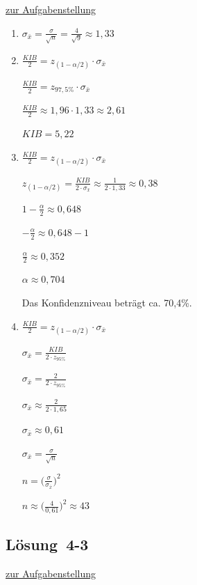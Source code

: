\documentclass[
  11pt,
  ngerman,
  a4paper,
]{report}
\begin{document}
\protect\hyperlink{aufgabe-4-2}{zur Aufgabenstellung}

\begin{enumerate}
\def\labelenumi{\alph{enumi})}
\item
  \(\sigma _{\bar{x}}=\frac{\sigma}{\sqrt{n}}=\frac{4}{\sqrt{9}}\approx1{,}33\)
\item
  \(\frac{\mathit{KIB}}{2}=z_{(1-\alpha/2)} \cdot \sigma_{\bar{x}}\)

  \(\frac{\mathit{KIB}}{2}= z_{97{,}5\%}\cdot \sigma_{\bar{x}}\)

  \(\frac{\mathit{KIB}}{2}\approx 1{,}96 \cdot 1{,}33 \approx 2{,}61\)

  \(\mathit{KIB}=5{,}22\)
\item
  \(\frac{\mathit{KIB}}{2}=z_{(1-\alpha/2)} \cdot \sigma_{\bar{x}}\)

  \(z_{(1-\alpha/2)} = \frac{\mathit{KIB}}{2 \cdot \sigma_{\bar{x}}}\approx\frac{1}{2 \cdot 1{,}33}\approx0{,}38\)

  \(1-\frac{\alpha}{2} \approx 0{,}648\)

  \(-\frac{\alpha}{2} \approx 0{,}648 - 1\)

  \(\frac{\alpha}{2} \approx 0{,}352\)

  \(\alpha \approx 0{,}704\)

  Das Konfidenzniveau beträgt ca. 70,4\%.
\item
  \(\frac{\mathit{KIB}}{2} = z_{(1-\alpha/2)} \cdot \sigma_{\bar{x}}\)

  \(\sigma_{\bar{x}} = \frac{\mathit{KIB}}{2\cdot z_{95\%}}\)

  \(\sigma_{\bar{x}} = \frac{2}{2 \cdot z_{95\%}}\)

  \(\sigma_{\bar{x}} \approx \frac{2}{2 \cdot 1{,}65}\)

  \(\sigma_{\bar{x}} \approx 0{,}61\)

  \(\sigma_{\bar{x}}=\frac{\sigma}{\sqrt{n}}\)

  \(n = \big(\frac{\sigma}{\sigma_{\bar{x}}}\big)^2\)

  \(n \approx \big(\frac{4}{0{,}61}\big)^2\approx43\)
\end{enumerate}

\hypertarget{loesung-4-3}{%
\subsection{Lösung~4-3}\label{loesung-4-3}}

\protect\hyperlink{aufgabe-4-3}{zur Aufgabenstellung}
\end{document}
